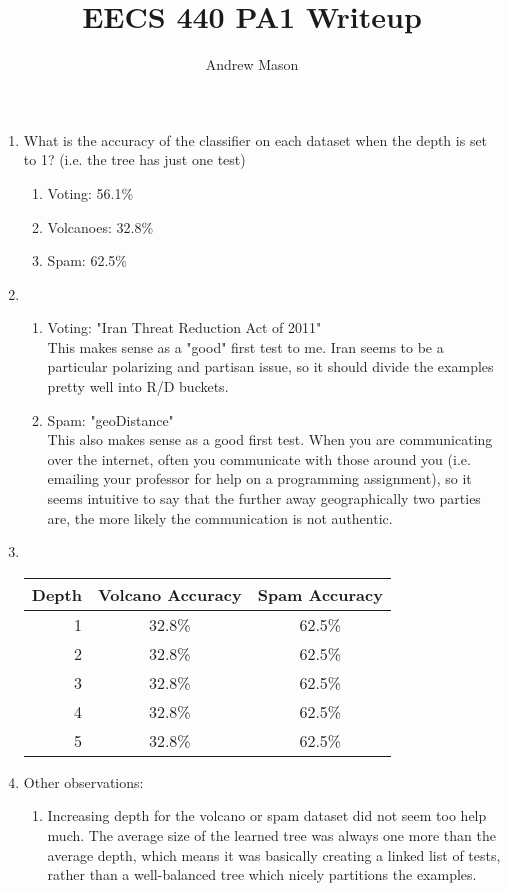 \documentclass[12pt]{article}
\title{EECS 440 PA1 Writeup}
\author{Andrew Mason}
\begin{document}
\maketitle

\begin{enumerate}
  \item What is the accuracy of the classifier on each dataset when the depth
    is set to 1? (i.e. the tree has just one test)
    \begin{enumerate}
      \item Voting: 56.1\%
      \item Volcanoes: 32.8\%
      \item Spam: 62.5\%
    \end{enumerate}
  \item
    \begin{enumerate}
      \item Voting: "Iran Threat Reduction Act of 2011"\\
        This makes sense as a "good" first test to me. Iran seems to be a
        particular polarizing and partisan issue, so it should divide the
        examples pretty well into R/D buckets.
      \item Spam: "geoDistance"\\
        This also makes sense as a good first test. When you are communicating
        over the internet, often you communicate with those around you (i.e.
        emailing your professor for help on a programming assignment), so it
        seems intuitive to say that the further away geographically two parties
        are, the more likely the communication is not authentic.
    \end{enumerate}
  \item ~\\
    \begin{tabular}{|r|c|c|}
      \hline
      Depth & Volcano Accuracy & Spam Accuracy \\ \hline
      1 & 32.8\% & 62.5\% \\ \hline
      2 & 32.8\% & 62.5\% \\ \hline
      3 & 32.8\% & 62.5\% \\ \hline
      4 & 32.8\% & 62.5\% \\ \hline
      5 & 32.8\% & 62.5\% \\ \hline
    \end{tabular}
  \item
    Other observations:\\
    \begin{enumerate}
      \item Increasing depth for the volcano or spam dataset did not seem too
      help much. The average size of the learned tree was always one more than
      the average depth, which means it was basically creating a linked list of
      tests, rather than a well-balanced tree which nicely partitions the
      examples.\\


\end{enumerate}
\end{enumerate}
\end{document}
